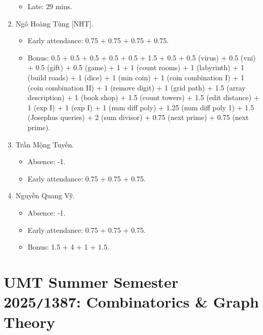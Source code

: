 \documentclass{article}
\begin{document}
\begin{enumerate}
\begin{itemize}
		\item Late: 29 mins.
	\end{itemize}
	\item {\sc Ngô Hoàng Tùng [NHT].}
	\begin{itemize}
		\item Early attendance: 0.75 + 0.75 + 0.75 + 0.75.
		\item Bonus: 0.5 + 0.5 + 0.5 + 0.5 + 0.5 + 1.5 + 0.5 + 0.5 (virus) + 0.5 (vni) + 0.5 (gift) + 0.5 (game) + 1 + 1 (count rooms) + 1 (labyrinth) + 1 (build roads) + 1 (dice) + 1 (min coin) + 1 (coin combination I) + 1 (coin combination II) + 1 (remove digit) + 1 (grid path) + 1.5 (array description) + 1 (book shop) + 1.5 (count towers) + 1.5 (edit distance) + 1 (exp I) + 1 (exp I) + 1 (num diff poly) + 1.25 (num diff poly 1) + 1.5 (Josephus queries) + 2 (sum divisor) + 0.75 (next prime) + 0.75 (next prime).
	\end{itemize}
	\item {\sc Trần Mộng Tuyền.}
	\begin{itemize}
		\item Absence: -1.
		\item Early attendance: 0.75 + 0.75 + 0.75.
	\end{itemize}
	\item {\sc Nguyễn Quang Vỹ.}
	\begin{itemize}
		\item Absence: -1.
		\item Early attendance: 0.75 + 0.75 + 0.75.
		\item Bonus: 1.5 + 4 + 1 + 1.5.
	\end{itemize}
\end{enumerate}


\section{UMT Summer Semester 2025{\tt/}1387: Combinatorics \& Graph Theory}
\end{document}
